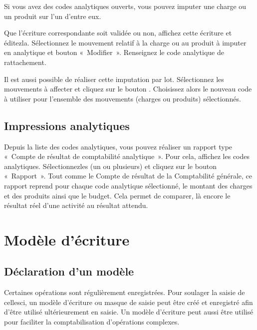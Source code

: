 \documentclass[a4paper,10pt,oneside,french]{sphinxmanual}
\begin{document}
\sphinxAtStartPar
Si vous avez des codes analytiques ouverts, vous pouvez imputer une charge ou un produit sur l’un d’entre eux.
\begin{quote}

\noindent{}
\end{quote}

\sphinxAtStartPar
Que l’écriture correspondante soit validée ou non, affichez cette écriture  et éditez\sphinxhyphen{}la.
Sélectionnez le  mouvement relatif à la charge ou au produit à imputer en analytique et bouton « Modifier ».
Renseignez le code analytique de rattachement.

\sphinxAtStartPar
Il est aussi possible de réaliser cette imputation par lot.
Sélectionnez les mouvements à affecter et cliquez sur le bouton . Choisissez alors le nouveau code à utiliser
pour l’ensemble des mouvements (charges ou  produits) sélectionnés.


\subsection{Impressions analytiques}
\label{\detokenize{accounting/costaccounting:impressions-analytiques}}
\sphinxAtStartPar
Depuis la liste des codes analytiques, vous pouvez réaliser un rapport type « Compte de résultat de comptabilité analytique ».
Pour cela, affichez les codes analytiques. Sélectionnez\sphinxhyphen{}les (un ou plusieurs) et cliquez sur le bouton « Rapport ».
Tout comme le Compte de résultat de la Comptabilité générale, ce rapport reprend pour chaque code analytique sélectionné, le montant des charges et des produits ainsi que le budget. Cela permet de comparer, là encore le résultat réel d’une activité au résultat attendu.


\section{Modèle d’écriture}
\label{\detokenize{accounting/model:modele-d-ecriture}}\label{\detokenize{accounting/model::doc}}

\subsection{Déclaration d’un modèle}
\label{\detokenize{accounting/model:declaration-d-un-modele}}
\sphinxAtStartPar
Certaines opérations sont régulièrement enregistrées. Pour soulager la saisie de celles\sphinxhyphen{}ci, un modèle d’écriture ou masque de saisie peut être créé et enregistré afin d’être utilisé ultérieurement en saisie.
Un modèle d’écriture peut aussi être utilisé pour faciliter la comptabilisation d’opérations complexes.
\end{document}

